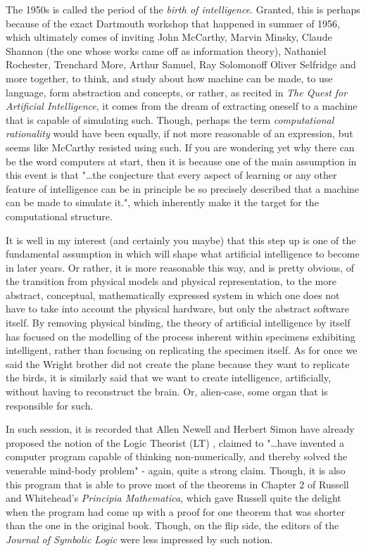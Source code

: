 The 1950s is called the period of the \textit{birth of intelligence}. Granted, this is perhaps because of the exact Dartmouth workshop that happened in summer of 1956, which ultimately comes of inviting John McCarthy, Marvin Minsky, Claude Shannon (the one whose works came off as information theory), Nathaniel Rochester, Trenchard More, Arthur Samuel, Ray Solomonoff Oliver Selfridge and more together, to think, and study about how machine can be made, to use language, form abstraction and concepts, or rather, as recited in \textit{The Quest for Artificial Intelligence}, it comes from the dream of extracting oneself to a machine that is capable of simulating such. Though, perhaps the term \textit{computational rationality} would have been equally, if not more reasonable of an expression, but seems like McCarthy resisted using such. If you are wondering yet why there can be the word computers at start, then it is because one of the main assumption in this event is that "\dots the conjecture that every aspect of learning or any other feature of intelligence can be in principle be so precisely described that a machine can be made to simulate it.", which inherently make it the target for the computational structure. 

It is well in my interest (and certainly you maybe) that this step up is one of the fundamental assumption in which will shape what artificial intelligence to become in later years. Or rather, it is more reasonable this way, and is pretty obvious, of the transition from physical models and physical representation, to the more abstract, conceptual, mathematically expressed system in which one does not have to take into account the physical hardware, but only the abstract software itself. By removing physical binding, the theory of artificial intelligence by itself has focused on the modelling of the process inherent within specimens exhibiting intelligent, rather than focusing on replicating the specimen itself. As for once we said the Wright brother did not create the plane because they want to replicate the birds, it is similarly said that we want to create intelligence, artificially, without having to reconstruct the brain. Or, alien-case, some organ that is responsible for such. 

In such session, it is recorded that Allen Newell and Herbert Simon have already proposed the notion of the Logic Theorist (LT) \cite{1056797NewellSimon}, claimed to "\dots have invented a computer program capable of thinking non-numerically, and thereby solved the venerable mind-body problem" - again, quite a strong claim. Though, it is also this program that is able to prove most of the theorems in Chapter 2 of Russell and Whitehead's \textit{Principia Mathematica}, which gave Russell quite the delight when the program had come up with a proof for one theorem that was shorter than the one in the original book. Though, on the flip side, the editors of the \textit{Journal of Symbolic Logic} were less impressed by such notion. 

